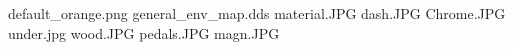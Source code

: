 default_orange.png
general_env_map.dds
material.JPG
dash.JPG
Chrome.JPG
under.jpg
wood.JPG
pedals.JPG
magn.JPG
